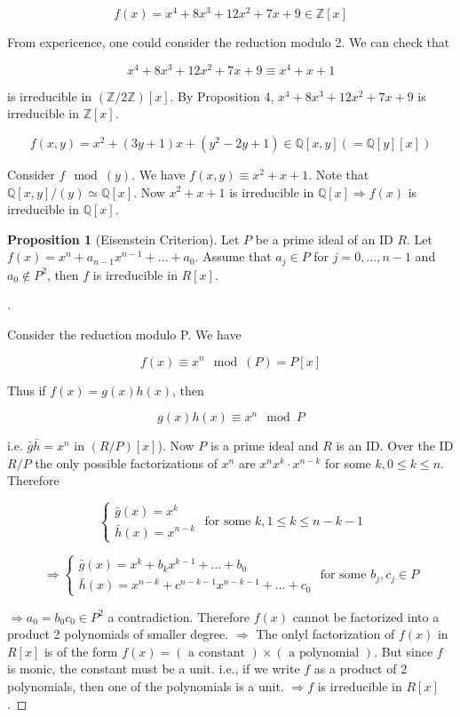 \documentclass{article}
\theoremstyle{definition}
\newtheorem{prop}{Proposition}
\newenvironment{proofs}[1][\proofname]{%
  \begin{proof}[#1]$ $\par\nobreak\ignorespaces
}{%
  \end{proof}
}
\begin{document}
  \begin{ex}
	$$f(x) = x^4 + 8 x^3 + 12x^2 + 7x + 9 \in \mathbb{Z}[x]$$
  
	From expericence, one could consider the reduction modulo 2. We can check that 
  
	$$x^4 + 8x^3 + 12x^2 + 7x + 9 \equiv x^4 + x + 1$$
  
	is irreducible in $(\mathbb{Z}/2\mathbb{Z})[x]$. By Proposition 4, $x^4 + 8 x^3 + 12 x^2 + 7x + 9$ is irreducible in $\mathbb{Z}[x]$. 
  \end{ex}
  
  \begin{ex}
	$$f(x, y) = x^2 + (3y + 1)x + (y^2 - 2y + 1) \in \mathbb{Q}[x, y](=\mathbb{Q}[y][x])$$
  
	Consider $f \mod (y)$. We have $f(x, y) \equiv x^2 + x + 1$. Note that $\mathbb{Q}[x, y]/(y) \simeq \mathbb{Q}[x]$. Now $x^2 + x + 1$ is irreducible in $\mathbb{Q}[x] \Rightarrow f(x)$ is irreducible in $\mathbb{Q}[x]$.  
  \end{ex}
  
  \begin{prop}[Eisenstein Criterion]
	Let $P$ be a prime ideal of an ID $R$. Let $f(x) = x^n + a_{n - 1}x^{n - 1} + \hdots + a_0$. Assume that $a_j \in P$ for $j = 0, \hdots, n - 1$ and $a_0 \notin P^2$, then $f$ is irreducible in $R[x]$.  
  \end{prop}
  
  \begin{proofs}
	Consider the reduction modulo P. We have
  
	$$f(x) \equiv x^n \mod (P)=P[x]$$
  
	Thus if $f(x) = g(x) h(x)$, then 
  
	$$g(x) h(x) \equiv x^n \mod P$$
  
	i.e. $\bar{g} \bar{h} = x^n$ in $(R/P)[x]$). Now $P$ is a prime ideal and $R$ is an ID. Over the ID $R/P$ the only possible factorizations of $x^n$ are $x^n  x^k \cdot x^{n - k}$ for some $k, 0 \leq k \leq n$. Therefore 
  
	$$
	\left\{
	\begin{array}{c}
	  \bar{g}(x) = x^k \\
	  \bar{h}(x) = x^{n - k}
	\end{array}
	\right.
	\text{ for some } k, 1 \leq k \leq n - k - 1
	$$
  
	
	$$
	\Rightarrow 
	\left\{
	\begin{array}{c}
	  \bar{g}(x) = x^k + b_k x^{k - 1} + \hdots + b_0 \\
	  \bar{h}(x) = x^{n - k} + c^{n - k - 1} x^{n - k - 1} + \hdots + c_0
	\end{array}
	\right.
	\text{ for some } b_j, c_j \in P
	$$
  
	$\Rightarrow a_0 = b_0 c_0 \in P^2$ a contradiction. Therefore $f(x)$ cannot be factorized into a product 2 polynomials of smaller degree. $\Rightarrow $ The onlyl factorization of $f(x)$ in $R[x]$ is of the form $f(x) = (\text{ a constant }) \times (\text{ a polynomial })$. But since $f$ is monic, the constant must be a unit. i.e., if we write $f$ as a product of 2 polynomials, then one of the polynomials is a unit. $\Rightarrow f$ is irreducible in $R[x]$.  
  \end{proofs}
  
\end{document}
